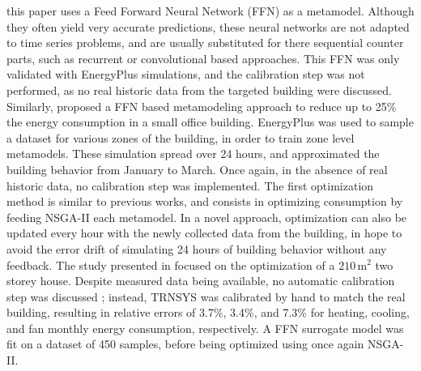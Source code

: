 \documentclass[12pt]{article}
\begin{document}
this paper uses a Feed Forward Neural Network (FFN) as a metamodel. Although they often yield very accurate predictions, these neural networks are not adapted to time series problems, and are usually substituted for there sequential counter parts, such as recurrent or convolutional based approaches. This FFN was only validated with EnergyPlus simulations, and the calibration step was not performed, as no real historic data from the targeted building were discussed. Similarly, \cite{Reynolds2018AZB} proposed a FFN based metamodeling approach to reduce up to 25\% the energy consumption in a small office building. EnergyPlus was used to sample a dataset for various zones of the building, in order to train zone level metamodels. These simulation spread over 24 hours, and approximated the building behavior from January to March. Once again, in the absence of real historic data, no calibration step was implemented. The first optimization method is similar to previous works, and consists in optimizing consumption by feeding NSGA-II each metamodel. In a novel approach, optimization can also be updated every hour with the newly collected data from the building, in hope to avoid the error drift of simulating 24 hours of building behavior without any feedback. The study presented in \cite{Magnier2010MultiobjectiveOO} focused on the optimization of a $210\,\mathrm{m}^2$ two storey house. Despite measured data being available, no automatic calibration step was discussed ; instead, TRNSYS was calibrated by hand to match the real building, resulting in relative errors of 3.7\%, 3.4\%, and 7.3\% for heating, cooling, and fan monthly energy consumption, respectively. A FFN surrogate model was fit on a dataset of 450 samples, before being optimized using once again NSGA-II. %



\end{document}
